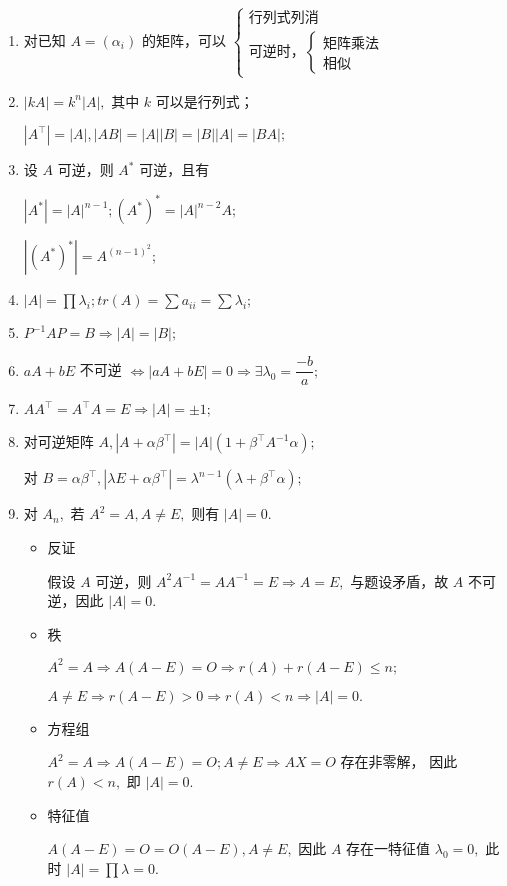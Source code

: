 \begin{enumerate}
    \item 对已知 $ A = (\alpha_i) $ 的矩阵，可以
    $ \begin{cases}
        \textrm{行列式列消}\\ \textrm{可逆时，}\begin{cases}
            \textrm{矩阵乘法}\\\textrm{相似}
        \end{cases}
    \end{cases} $ 
    \item $ |kA| = k^n|A|, $ 其中 $ k $ 可以是行列式；
    
    $ |A^\top|=|A|,|AB|=|A||B|=|B||A|=|BA|; $ 
    \item 设 $ A $ 可逆，则 $ A^* $ 可逆，且有

    $ |A^*| = |A|^{n-1};(A^*)^* = |A|^{n-2}A; $ 

    $ |(A^*)^*| = A^{(n-1)^2}; $ 
    \item $ |A| = \prod \lambda_i; tr(A) = \sum a_{ii} = \sum \lambda_i; $ 
    \item $ P^{-1}AP = B \Rightarrow |A| = |B|; $ 
    \item $ aA + bE $ 不可逆 $ \Leftrightarrow |aA + bE| = 0 \Rightarrow \exists \lambda_0 = \dfrac{-b}{a}; $ 
    \item $ AA^\top = A^\top A = E \Rightarrow |A| = \pm 1; $ 
    \item 对可逆矩阵 $ A, |A + \alpha\beta^\top | = |A|(1+\beta^\top A^{-1}\alpha); $ 
    
    对 $ B = \alpha\beta^\top , |\lambda E + \alpha\beta^\top | = \lambda^{n-1}(\lambda + \beta^\top\alpha); $ 
    \item 对 $ A_n, $ 若 $ A^2 = A,A\neq E, $ 则有 $ |A| = 0. $ \begin{itemize}
        \item 反证
        
        假设 $ A $ 可逆，则 $ A^2A^{-1} = AA^{-1} = E \Rightarrow A = E, $ 与题设矛盾，故
        $ A $ 不可逆，因此 $ |A| = 0. $ 
        \item 秩
        
        $ A^2 = A \Rightarrow A(A-E) = O \Rightarrow r(A) + r(A-E) \leq n;$
        
        $ A\neq E \Rightarrow r(A-E)>0 \Rightarrow r(A) < n \Rightarrow |A| = 0. $ 
        \item 方程组
        
        $ A^2 = A \Rightarrow A(A-E) = O; A \neq E \Rightarrow AX = O $ 存在非零解，
        因此 $ r(A)<n, $ 即 $ |A|=0. $ 
        \item 特征值
        
        $ A(A-E) = O = O(A-E),A\neq E, $ 因此 $ A $ 存在一特征值 $ \lambda_0 = 0, $ 
        此时 $ |A| = \prod \lambda = 0. $ 
    \end{itemize}
\end{enumerate}

